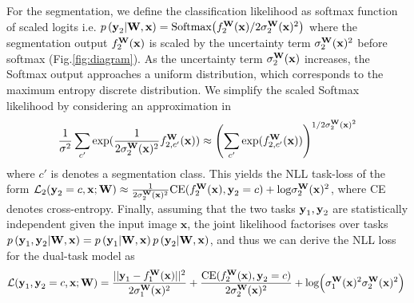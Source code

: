 For the segmentation, we define the classification likelihood as softmax function of scaled logits i.e. $p\left(\text{\textbf{y}}_{2}|\textbf{W},\mathbf{x}\right) = \text{Softmax}\big{(}f_{2}^{\text{\textbf{W}}}(\text{\textbf{x}})/2\sigma^{\mathbf{W}}_{2}(\text{\textbf{x}})^2\big{)}$ where the segmentation output $f_{2}^{\text{\textbf{W}}}(\text{\textbf{x}})$ is scaled by the uncertainty term $\sigma^{\mathbf{W}}_{2}(\text{\textbf{x}})^2$ before softmax (Fig.\ref{fig:diagram}). As the uncertainty term $\sigma^{\mathbf{W}}_{2}(\text{\textbf{x}})$ increases, the Softmax output approaches a uniform distribution, which corresponds to the maximum entropy discrete distribution. We simplify the scaled Softmax likelihood by considering an approximation in \cite{kendall2017multi} 
$$\frac{1}{\sigma^{2}}\sum_{c'}\text{exp}(\frac{1}{2\sigma^{\mathbf{W}}_{2}(\text{\textbf{x}})^2}f^{\text{\textbf{W}}}_{2,c'}(\text{\textbf{x}})) \approx \left(\sum_{c'}\text{exp}(f^{\mathbf{W}}_{2,c'}(\text{\textbf{x}}))\right)^{1/2\sigma^{\mathbf{W}}_{2}(\text{\textbf{x}})^2}$$ where $c'$ is denotes a segmentation class. This yields the NLL task-loss of the form $\mathcal{L}_{2}(\text{\textbf{y}}_{2}=c,\mathbf{x};\mathbf{W}) \approx \frac{1}{2\sigma^{\mathbf{W}}_{2}(\text{\textbf{x}})^2} \text{CE}(f_{2}^{\text{\textbf{W}}}(\text{\textbf{x}}),\text{\textbf{y}}_{2}=c)+ \text{log}\sigma^{\mathbf{W}}_{2}(\text{\textbf{x}})^2$, where CE denotes cross-entropy.
Finally, assuming that the two tasks $\text{\textbf{y}}_{1},\text{\textbf{y}}_{2}$ are statistically independent given the input image $\mathbf{x}$,  the joint likelihood factorises over tasks  $p\left(\text{\textbf{y}}_{1},\text{\textbf{y}}_{2}|\mathbf{W},\mathbf{x}\right)=p\left(\text{\textbf{y}}_{1}|\mathbf{W},\mathbf{x}\right)p\left(\text{\textbf{y}}_{2}|\mathbf{W},\mathbf{x}\right)$, and thus we can derive the NLL loss for the dual-task model as
\begin{equation*}
\mathcal{L}(\textbf{y}_{1},\textbf{y}_{2}=c,\mathbf{x};\mathbf{W}) =\frac{||\text{\textbf{y}}_{1}-f^{\text{\textbf{W}}}_1(\text{\textbf{x}})||^{2}}{2\sigma_{1}^{\text{\textbf{W}}}(\text{\textbf{x}})^{2}} + \frac{\text{CE}(f_{2}^{\text{\textbf{W}}}(\text{\textbf{x}}),\text{\textbf{y}}_{2}=c)}{2\sigma^{\mathbf{W}}_{2}(\text{\textbf{x}})^2} + \text{log}\Big{(}\sigma^{\mathbf{W}}_{1}(\text{\textbf{x}})^2\sigma^{\mathbf{W}}_{2}(\text{\textbf{x}})^2\Big{)}\;
\end{equation*}
